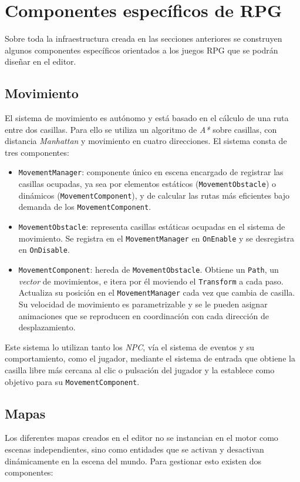 \section{Componentes específicos de RPG}
Sobre toda la infraestructura creada en las secciones anteriores se construyen algunos componentes específicos orientados a los juegos RPG que se podrán diseñar en el editor. 

\subsection{Movimiento}
El sistema de movimiento es autónomo y está basado en el cálculo de una ruta entre dos casillas. Para ello se utiliza un algoritmo de \textit{A*} sobre casillas, con distancia \textit{Manhattan} y movimiento en cuatro direcciones. El sistema consta de tres componentes: 

\begin{itemize}
	\item \texttt{MovementManager}: componente único en escena encargado de registrar las casillas ocupadas, ya sea por elementos estáticos (\texttt{MovementObstacle}) o dinámicos (\texttt{MovementComponent}), y de calcular las rutas más eficientes bajo demanda de los \texttt{MovementComponent}. 
	\item \texttt{MovementObstacle}: representa casillas estáticas ocupadas en el sistema de movimiento. Se registra en el \texttt{MovementManager} en \texttt{OnEnable} y se desregistra en \texttt{OnDisable}. 
	\item \texttt{MovementComponent}: hereda de \texttt{MovementObstacle}. Obtiene un \texttt{Path}, un \textit{vector} de movimientos, e itera por él moviendo el \texttt{Transform} a cada paso. Actualiza su posición en el \texttt{MovementManager} cada vez que cambia de casilla. Su velocidad de movimiento es parametrizable y se le pueden asignar animaciones que se reproducen en coordinación con cada dirección de desplazamiento. 
\end{itemize}

Este sistema lo utilizan tanto los \textit{NPC}, vía el sistema de eventos y su comportamiento, como el jugador, mediante el sistema de entrada que obtiene la casilla libre más cercana al clic o pulsación del jugador y la establece como objetivo para su \texttt{MovementComponent}. 

\subsection{Mapas}
Los diferentes mapas creados en el editor no se instancian en el motor como escenas independientes, sino como entidades que se activan y desactivan dinámicamente en la escena del mundo. Para gestionar esto existen dos componentes:

